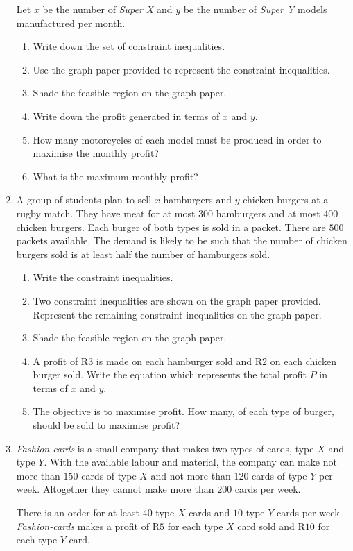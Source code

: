\begin{eocexercises}{}
\begin{enumerate}
{Let $x$ be the number of \textit{Super X} and $y$ be the number of \textit{Super Y} models
manufactured per month.

\begin{enumerate}
\item{Write down the set of constraint inequalities.}
\item{Use the graph paper provided to represent the constraint inequalities.}
\item{Shade the feasible region on the graph paper.}
\item{Write down the profit generated in terms of $x$ and $y$.}
\item{How many motorcycles of each model must be produced in order to maximise the monthly profit?}
\item{What is the maximum monthly profit?}
\end{enumerate}
}
\item{A group of students plan to sell $x$ hamburgers and $y$ chicken burgers at a rugby match. They have meat for at most $300$ hamburgers and at most $400$ chicken burgers. Each burger of
both types is sold in a packet. There are $500$ packets available. The demand is likely to be such that the number of chicken burgers sold is at least half the number of hamburgers sold.
\begin{enumerate}
\item{Write the constraint inequalities.}
\item{Two constraint inequalities are shown on the graph paper provided. Represent the remaining constraint inequalities on the graph paper.}
\item{Shade the feasible region on the graph paper.}
\item{A profit of R$3$ is made on each hamburger sold and R$2$ on each chicken burger sold. Write the equation which represents the total profit $P$ in terms of $x$ and $y$.}
\item{The objective is to maximise profit. How many, of each type of burger, should be sold to maximise profit?}
\end{enumerate}}

\item{\textit{Fashion-cards} is a small company that makes two types of cards, type $X$ and type $Y$. With the available labour and material, the company can make not more than $150$ cards of type $X$ and not more than $120$ cards of type $Y$ per week. Altogether they cannot make more than $200$ cards per week.

There is an order for at least $40$ type $X$ cards and $10$ type $Y$ cards per week.
\textit{Fashion-cards} makes a profit of R$5$ for each type $X$ card sold and R$10$ for each type $Y$ card.

}
\end{enumerate}
\end{eocexercises}
